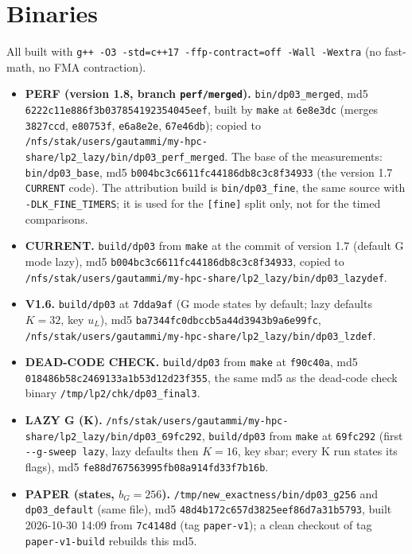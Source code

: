 \documentclass[11pt]{article}
\begin{document}
\section{Binaries}
All built with \texttt{g++ -O3 -std=c++17 -ffp-contract=off -Wall -Wextra} (no fast-math, no FMA contraction).
\begin{itemize}[leftmargin=*]
  \item \textbf{PERF (version 1.8, branch \texttt{perf/merged}).} \texttt{bin/dp03\_merged}, md5 \texttt{6222c11e886f3b037854192354045eef}, built by \texttt{make} at \texttt{6e8e3dc} (merges \texttt{3827ccd}, \texttt{e80753f}, \texttt{e6a8e2e}, \texttt{67e46db}); copied to \texttt{/nfs/stak/users/gautammi/my-hpc-share/lp2\_lazy/bin/dp03\_perf\_merged}. The base of the measurements: \texttt{bin/dp03\_base}, md5 \texttt{b004bc3c6611fc44186db8c3c8f34933} (the version 1.7 \texttt{CURRENT} code). The attribution build is \texttt{bin/dp03\_fine}, the same source with \texttt{-DLK\_FINE\_TIMERS}; it is used for the \texttt{[fine]} split only, not for the timed comparisons.
  \item \textbf{CURRENT.} \texttt{build/dp03} from \texttt{make} at the commit of version 1.7 (default G mode lazy), md5 \texttt{b004bc3c6611fc44186db8c3c8f34933}, copied to \texttt{/nfs/stak/users/gautammi/my-hpc-share/lp2\_lazy/bin/dp03\_lazydef}.
  \item \textbf{V1.6.} \texttt{build/dp03} at \texttt{7dda9af} (G mode states by default; lazy defaults $K=32$, key $u_L$), md5 \texttt{ba7344fc0dbccb5a44d3943b9a6e99fc}, \texttt{/nfs/stak/users/gautammi/my-hpc-share/lp2\_lazy/bin/dp03\_lzdef}.
  \item \textbf{DEAD-CODE CHECK.} \texttt{build/dp03} from \texttt{make} at \texttt{f90c40a}, md5 \texttt{018486b58c2469133a1b53d12d23f355}, the same md5 as the dead-code check binary \texttt{/tmp/lp2/chk/dp03\_final3}.
  \item \textbf{LAZY G (K).} \texttt{/nfs/stak/users/gautammi/my-hpc-share/lp2\_lazy/bin/dp03\_69fc292}, \texttt{build/dp03} from \texttt{make} at \texttt{69fc292} (first \texttt{-{}-g-sweep lazy}, lazy defaults then $K=16$, key sbar; every K run states its flags), md5 \texttt{fe88d767563995fb08a914fd33f7b16b}.
  \item \textbf{PAPER (states, $b_G=256$).} \texttt{/tmp/new\_exactness/bin/dp03\_g256} and \texttt{dp03\_default} (same file), md5 \texttt{48d4b172c657d3825eef86d7a31b5793}, built 2026-10-30 14:09 from \texttt{7c4148d} (tag \texttt{paper-v1}); a clean checkout of tag \texttt{paper-v1-build} rebuilds this md5.

\end{itemize}
\end{document}

